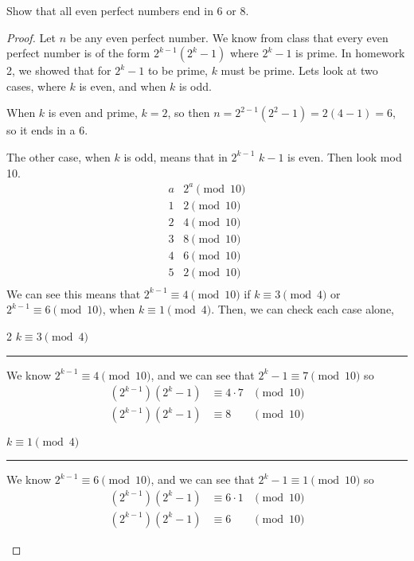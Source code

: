 \documentclass[11pt]{article}
\newenvironment{problem}[2][Problem]{\begin{trivlist}
\item[\hskip \labelsep {\bfseries #1}\hskip \labelsep {\bfseries #2.}]}{\end{trivlist}}
\begin{document}
\begin{problem}{13}
Show that all even perfect numbers end in 6 or 8.
\end{problem}

\setlength{\columnseprule}{1pt}
\def\columnseprulecolor{\color{black}}
\begin{proof}
  Let $n$ be any even perfect number. We know from class that every even perfect number is of the form $2^{k-1}(2^k-1)$ where $2^{k}-1$ is prime. In homework 2, we showed that for $2^{k}-1$ to be prime, $k$ must be prime. Lets look at two cases, where $k$ is even, and when $k$ is odd.

  When $k$ is even and prime, $k=2$, so then $n=2^{2-1}(2^2-1)=2(4-1)=6$, so it ends in a 6.

  The other case, when $k$ is odd, means that in $2^{k-1}$ $k-1$ is even. Then look mod 10.
  \[
    \begin{array}{c|c}
      a & 2^{a}\pmod{10} \\
      \hline
      1 & 2 \pmod{10}    \\
      2 & 4 \pmod{10}    \\
      3 & 8 \pmod{10}    \\
      4 & 6 \pmod{10}    \\
      5 & 2 \pmod{10}    \\
    \end{array}
  \]
  We can see this means that $2^{k-1}\equiv 4\pmod{10}$ if $k\equiv 3\pmod{4}$ or $2^{k-1}\equiv 6\pmod{10}$, when $k\equiv 1\pmod{4}$. Then, we can check each case alone,
  \begin{multicols}{2}
    $k\equiv 3\pmod{4}$
    \hrule
    \hspace{1pt}

    We know $2^{k-1}\equiv 4\pmod{10}$, and we can see that $2^k-1 \equiv 7\pmod{10}$ so
    \begin{align*}
      (2^{k-1})(2^k-1) & \equiv 4 \cdot 7 & \pmod{10} \\
      (2^{k-1})(2^k-1) & \equiv 8         & \pmod{10}
    \end{align*}

    \columnbreak
    $k\equiv 1\pmod{4}$
    \hrule
    \hspace{1pt}

    We know $2^{k-1}\equiv 6\pmod{10}$, and we can see that $2^k-1 \equiv 1\pmod{10}$ so
    \begin{align*}
      (2^{k-1})(2^k-1) & \equiv 6 \cdot 1 & \pmod{10} \\
      (2^{k-1})(2^k-1) & \equiv 6         & \pmod{10}
    \end{align*}
  \end{multicols}
\end{proof}
\end{document}
